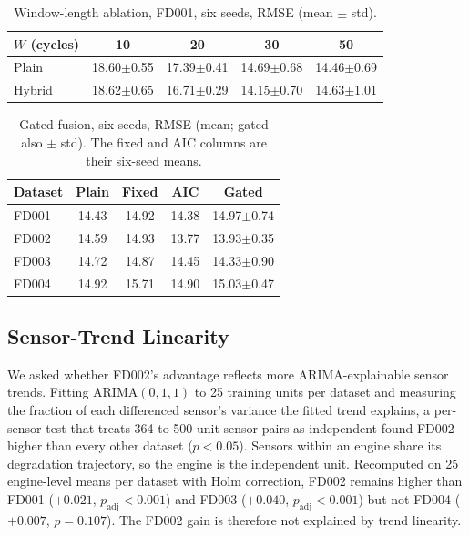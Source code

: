 \documentclass[conference]{IEEEtran}
\begin{document}
\begin{table}[t]
\centering
\caption{Window-length ablation, FD001, six seeds, RMSE (mean $\pm$ std).}
\label{tab:ablation}
\footnotesize
\setlength{\tabcolsep}{3pt}
\begin{tabular}{lcccc}
\toprule
$W$ (cycles) & 10 & 20 & 30 & 50 \\
\midrule
Plain & 18.60{\tiny$\pm$0.55} & 17.39{\tiny$\pm$0.41} & 14.69{\tiny$\pm$0.68} & 14.46{\tiny$\pm$0.69} \\
Hybrid & 18.62{\tiny$\pm$0.65} & 16.71{\tiny$\pm$0.29} & 14.15{\tiny$\pm$0.70} & 14.63{\tiny$\pm$1.01} \\
\bottomrule
\end{tabular}
\end{table}

\begin{table}[t]
\centering
\caption{Gated fusion, six seeds, RMSE (mean; gated also $\pm$ std). The fixed and AIC columns are their six-seed means.}
\label{tab:gated}
\footnotesize
\begin{tabular}{lcccc}
\toprule
Dataset & Plain & Fixed & AIC & Gated \\
\midrule
FD001 & 14.43 & 14.92 & 14.38 & 14.97{\tiny$\pm$0.74} \\
FD002 & 14.59 & 14.93 & 13.77 & 13.93{\tiny$\pm$0.35} \\
FD003 & 14.72 & 14.87 & 14.45 & 14.33{\tiny$\pm$0.90} \\
FD004 & 14.92 & 15.71 & 14.90 & 15.03{\tiny$\pm$0.47} \\
\bottomrule
\end{tabular}
\end{table}

\subsection{Sensor-Trend Linearity}
We asked whether FD002's advantage reflects more ARIMA-explainable sensor trends. Fitting ARIMA$(0,1,1)$ to 25 training units per dataset and measuring the fraction of each differenced sensor's variance the fitted trend explains, a per-sensor test that treats 364 to 500 unit-sensor pairs as independent found FD002 higher than every other dataset ($p<0.05$). Sensors within an engine share its degradation trajectory, so the engine is the independent unit. Recomputed on 25 engine-level means per dataset with Holm correction, FD002 remains higher than FD001 ($+0.021$, $p_{\text{adj}}<0.001$) and FD003 ($+0.040$, $p_{\text{adj}}<0.001$) but not FD004 ($+0.007$, $p=0.107$). The FD002 gain is therefore not explained by trend linearity.
\end{document}
